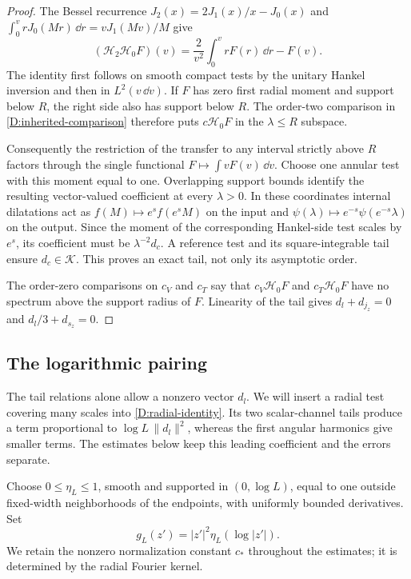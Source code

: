 \begin{proof}
The Bessel recurrence $J_2(x)=2J_1(x)/x-J_0(x)$ and
$\int_0^v rJ_0(Mr)\,\dd r=vJ_1(Mv)/M$ give
\begin{equation}\label{D:hankel-transfer}
 (\mathcal H_2\mathcal H_0F)(v)
 =\frac2{v^2}\int_0^v rF(r)\,\dd r-F(v).
\end{equation}
The identity first follows on smooth compact tests by the unitary
Hankel inversion and then in $L^2(v\,\dd v)$.  If $F$ has zero
first radial moment and support below $R$, the right side also
has support below $R$.  The order-two comparison in
\eqref{D:inherited-comparison} therefore puts
$c\mathcal H_0F$ in the $\lambda\leq R$ subspace.

Consequently the restriction of the transfer to any interval
strictly above $R$ factors through the single functional
$F\mapsto\int vF(v)\,\dd v$.  Choose one annular test with this
moment equal to one.  Overlapping support bounds identify the
resulting vector-valued coefficient at every $\lambda>0$.
In these coordinates internal dilatations act as
$f(M)\mapsto e^sf(e^sM)$ on the input and
$\psi(\lambda)\mapsto e^{-s}\psi(e^{-s}\lambda)$ on the output.
Since the moment of the corresponding Hankel-side test scales
by $e^s$, its coefficient must be $\lambda^{-2}d_c$.
A reference test and its square-integrable tail ensure
$d_c\in\mathcal K$.  This proves an exact tail, not only its
asymptotic order.

The order-zero comparisons on $c_V$ and $c_T$ say that
$c_V\mathcal H_0F$ and $c_T\mathcal H_0F$ have no spectrum above
the support radius of $F$.  Linearity of the tail gives
$d_l+d_{j_z}=0$ and $d_l/3+d_{s_z}=0$.
\end{proof}

\subsection{The logarithmic pairing}

The tail relations alone allow a nonzero vector $d_l$.  We will insert
a radial test covering many scales into \eqref{D:radial-identity}.
Its two scalar-channel tails produce a term proportional to
$\log L\,\|d_l\|^2$, whereas the first angular harmonics give smaller
terms.  The estimates below keep this leading coefficient and the
errors separate.

Choose $0\leq\eta_L\leq1$, smooth and supported in
$(0,\log L)$, equal to one outside fixed-width neighborhoods
of the endpoints, with uniformly bounded derivatives.  Set
\begin{equation}\label{D:plateau}
 g_L(z')=|z'|^2\eta_L(\log|z'|).
\end{equation}
We retain the nonzero normalization constant $c_*$ throughout
the estimates; it is determined by the radial Fourier kernel.

